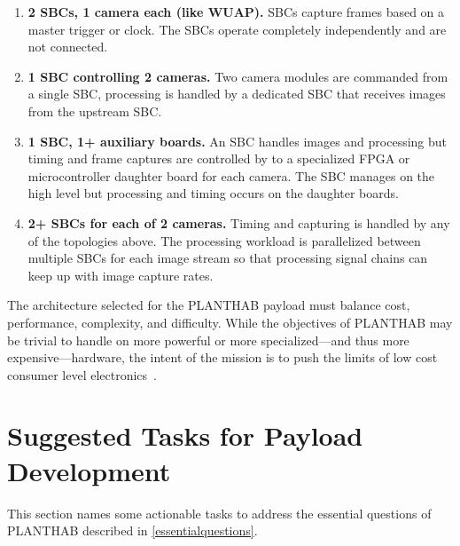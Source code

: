 \documentclass[conference]{IEEEtran} %
\begin{document}
\begin{enumerate}
    \item \textbf{2 SBCs, 1 camera each (like WUAP).} SBCs capture frames based on a master trigger or clock. The SBCs operate completely independently and are not connected.
    \item \textbf{1 SBC controlling 2 cameras.} Two camera modules are commanded from a single SBC, processing is handled by a dedicated SBC that receives images from the upstream SBC.
    \item \textbf{1 SBC, 1+ auxiliary boards.} An SBC handles images and processing but timing and frame captures are controlled by to a specialized FPGA or microcontroller daughter board for each camera. The SBC manages on the high level but processing and timing occurs on the daughter boards.
    \item \textbf{2+ SBCs for each of 2 cameras.} Timing and capturing is handled by any of the topologies above. The processing workload is parallelized between multiple SBCs for each image stream so that processing signal chains can keep up with image capture rates.
\end{enumerate}

The architecture selected for the PLANTHAB payload must balance cost, performance, complexity, and difficulty.
While the objectives of PLANTHAB may be trivial to handle on more powerful or more specialized---and thus more expensive---hardware, the intent of the mission is to push the limits of low cost consumer level electronics~\cite{habcvpdd}.

\section{Suggested Tasks for Payload Development}
This section names some actionable tasks to address the essential questions of PLANTHAB described in \autoref{essentialquestions}.
\end{document}
